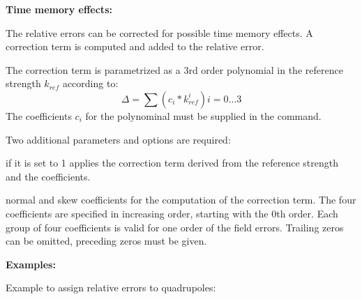 {\bf Time memory effects:}

The relative errors can be corrected for possible time memory effects. A
correction term is computed and added to the relative error. 

The correction term is parametrized as a 3rd order polynomial in the
reference strength $k_{ref}$ according to:  
\[ \Delta = \sum (c_i * \textit{k}^{i}_{ref})            i = 0...3\]
The coefficients $c_i$ for the polynominal must be supplied in the
command.  

Two additional parameters and options are required: 
\begin{madlist}
   if it is set to 1 applies the correction term derived from the
  reference strength and the coefficients.  

   normal and skew coefficients for the computation
  of the correction term. The four coefficients are specified in increasing
  order, starting with the 0th order. Each group of four coefficients is
  valid for one order of the field errors. Trailing zeros can be omitted,
  preceding zeros must be given.  
\end{madlist}

{\bf Examples:}

Example to assign relative errors to quadrupoles: 


